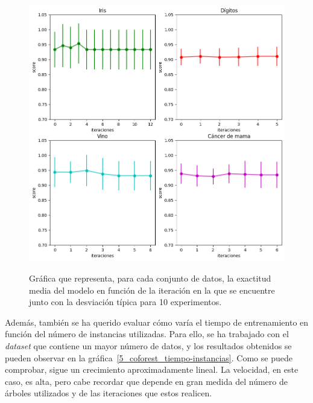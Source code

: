 \begin{figure}[h]
	\caption{Gráfica que representa, para cada conjunto de datos, la exactitud media del modelo en función de la iteración en la que se encuentre junto con la desviación típica para 10 experimentos.}
	\centering
	\includegraphics[width=\textwidth]{../img/memoria/5_coforest_score-iteraciones_individual}
	\label{5_coforest_score-iteraciones_individual}
\end{figure}


Además, también se ha querido evaluar cómo varía el tiempo de entrenamiento en función del número de instancias utilizadas. Para ello, se ha trabajado con el \textit{dataset} que contiene un mayor número de datos, y los resultados obtenidos se pueden observar en la gráfica~\ref{5_coforest_tiempo-instancias}. Como se puede comprobar, sigue un crecimiento aproximadamente lineal. La velocidad, en este caso, es alta, pero cabe recordar que depende en gran medida del número de árboles utilizados y de las iteraciones que estos realicen.

